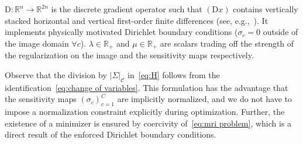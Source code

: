 \documentclass[twocolumn]{article}
\newcommand{\R}{\mathbb{R}}
\newcommand{\Function}[3]{#1\colon#2\to#3}
\begin{document}
\( \Function{\mathrm{D}}{\R^n}{\R^{2n}} \) is the discrete gradient operator such that \( (\mathrm{D} x) \) contains vertically stacked horizontal and vertical first-order finite differences (see, e.g.,~\cite{chambolle_introduction_2016}).
It implements physically motivated Dirichlet boundary conditions (\( \sigma_c = 0 \) outside of the image domain \( \forall c \)).
\( \lambda \in \R_+ \) and \( \mu \in \R_+ \) are scalars trading off the strength of the regularization on the image and the sensitivity maps respectively.

Observe that the division by \( |\Sigma|_{\mathcal{C}} \) in~\cref{eq:H} follows from the identification~\cref{eq:change of variables}.
This formulation has the advantage that the sensitivity maps \( {(\sigma_c)}_{c=1}^C \) are implicitly normalized, and we do not have to impose a normalization constraint explicitly during optimization.
Further, the existence of a minimizer is ensured by coercivity of~\cref{eq:mri problem}, which is a direct result of the enforced Dirichlet boundary conditions.
\end{document}

